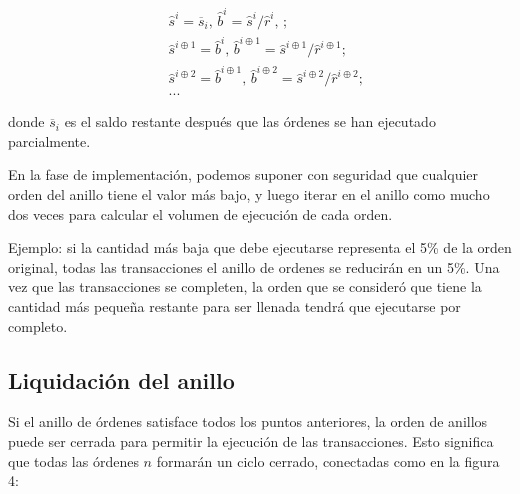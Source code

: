 \documentclass[UTF8,nofonts]{article}
\makeatletter
\newenvironment{figurehere}
 {\def\@captype{figure}}
 {}
\makeatother
\begin{document}
\begin{multicols}{2}
\[
\begin{split}
&\hat{s}^{i}=\overline{s}_i\text{, } \hat{b}^{i}=\hat{s}^{i}/ \hat{r}^i\text{, }\text{;}\\
&\hat{s}^{i\oplus 1}=\hat{b}^i\text{, } \hat{b}^{i\oplus 1}=\hat{s}^{i\oplus 1}/ \hat{r}^{i\oplus 1}\text{;}\\
&\hat{s}^{i\oplus 2}=\hat{b}^{i\oplus 1}\text{, } \hat{b}^{i\oplus 2}=\hat{s}^{i\oplus 2}/ \hat{r}^{i\oplus 2}\text{;}\\
& ...
\end{split}
\]

donde $\overline{s}_i$ es el saldo restante despu\'es que las \'ordenes se han ejecutado parcialmente.

En la fase de implementaci\'on, podemos suponer con seguridad que cualquier orden del anillo tiene el valor m\'as bajo, y luego iterar en el anillo como mucho dos veces para calcular el volumen de ejecuci\'on de cada orden.

Ejemplo: si la cantidad m\'as baja que debe ejecutarse representa el 5\% de la orden original, todas las transacciones el anillo de ordenes se reducir\'an en un 5\%. Una vez que las transacciones se completen, la orden que se consider\'o que tiene la cantidad m\'as peque\~na restante para ser llenada tendr\'a que ejecutarse por completo.


\subsection{Liquidaci\'on del anillo\label{sec:settlement}}
Si el anillo de \'ordenes satisface todos los puntos anteriores, la orden de anillos puede ser cerrada para permitir la ejecuci\'on de las transacciones. Esto significa que todas las \'ordenes $n$ formar\'an un ciclo cerrado, conectadas como en la figura 4:

\begin{center}
\begin{figurehere}
\centering
{}
\end{figurehere}
\end{center}
\end{multicols}
\end{document}
